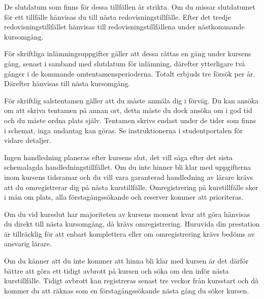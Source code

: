 \documentclass[a4paper,logo]{miunart}
\begin{document}
De slutdatum som finns för dessa tillfällen är strikta.
Om du missar slutdatumet för ett tillfälle hänvisas du till nästa 
redovisningstillfälle.
Efter det tredje redovisningstillfället hänvisas till redovisningstillfällena 
under nästkommande kursomgång.

För skriftliga inlämningsuppgifter gäller att dessa rättas en gång under 
kursens gång, senast i samband med slutdatum för inlämning, därefter 
ytterligare två gånger i de kommande omtentamensperioderna.
Totalt erbjuds tre försök per år.
Därefter hänvisas till nästa kursomgång.

För skriftlig salstentamen gäller att du måste anmäla dig i förväg.
Du kan ansöka om att skriva tentamen på annan ort, detta måste du dock ansöka 
om i god tid och du måste ordna plats själv.
Tentamen skrivs endast under de tider som finns i schemat, inga undantag kan 
göras.
Se instruktionerna i studentportalen för vidare detaljer.

Ingen handledning planeras efter kursens slut, det vill säga efter det sista 
schemalagda handledningstillfället.
Om du inte hinner bli klar med uppgifterna inom kursens tidsramar och du vill 
vara garanterad handledning av lärare krävs att du omregistrerar dig på nästa 
kurstillfälle.
Omregistrering på kurstillfälle sker i mån om plats, alla förstagångssökande 
och reserver kommer att prioriteras.

Om du vid kursslut har majoriteten av kursens moment kvar att göra hänvisas du 
direkt till nästa kursomgång, då krävs omregistrering.
Huruvida din prestation är tillräcklig för att enbart komplettera eller om 
omregistrering krävs bedöms av ansvarig lärare.

Om du känner att du inte kommer att hinna bli klar med kursen är det därför 
bättre att göra ett tidigt avbrott på kursen och söka om den inför nästa 
kurstillfälle.
Tidigt avbrott kan registreras senast tre veckor från kursstart och då kommer 
du att räknas som en förstagångssökande nästa gång du söker kursen.


\printbibliography
\end{document}
